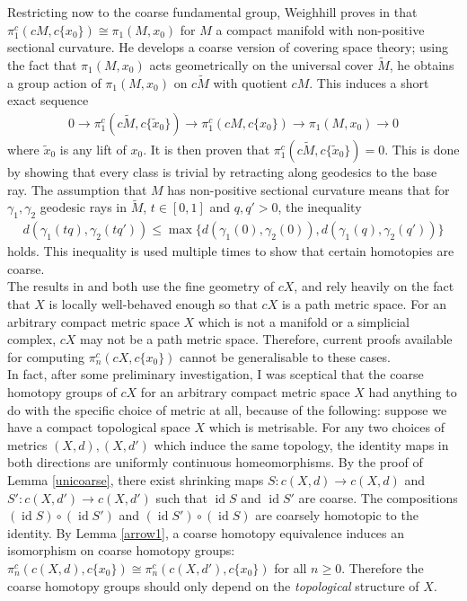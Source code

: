 \documentclass[a4paper,11pt]{article}
\theoremstyle{definition}
\theoremstyle{plain}
\theoremstyle{remark}
\DeclareMathOperator{\id}{id}
\begin{document}
Restricting now to the coarse fundamental group, Weighhill proves in \cite{weighill2025liftingcoarsehomotopies} that $\pi^{c}_{1}(cM,c\{x_0\}) \cong \pi_{1}(M,x_0)$ for $M$ a compact manifold with non-positive sectional curvature. He develops a coarse version of covering space theory; using the fact that $ \pi_{1}(M,x_0)$ acts geometrically on the universal cover $\tilde{M}$, he obtains a group action of $\pi_{1}(M,x_0)$ on $c\tilde{M}$ with quotient $cM$. This induces a short exact sequence
\begin{align*}
0\rightarrow \pi^{c}_{1}(c\tilde{M}, c \{\tilde{x}_{0}\}) \rightarrow  \pi_{1}^{c}(cM,c\{x_0\}) \rightarrow  \pi_{1}(M,x_0) \rightarrow 0
\end{align*}
where $\tilde{x}_{0}$ is any lift of $x_0$. It is then proven that $\pi^{c}_{1}(c\tilde{M}, c \{\tilde{x}_{0}\}) = 0$. This is done by showing that every class is trivial by retracting along geodesics to the base ray. The assumption that $M$ has non-positive sectional curvature means that for $\gamma_{1},\gamma_{2}$ geodesic rays in $\tilde{M}$, $t\in [0,1]$ and $q,q'>0$, the inequality 
\begin{align*}
d(\gamma_{1}(tq),\gamma_{2}(tq'))\leq \max \{d(\gamma_{1}(0),\gamma_{2}(0)),d(\gamma_{1}(q),\gamma_{2}(q')) \}
\end{align*}
holds. This inequality is used multiple times to show that certain homotopies are coarse.  \\


The results in \cite{mitchener2020coarse} and \cite{weighill2025liftingcoarsehomotopies} both use the fine geometry of $cX$, and rely heavily on the fact that $X$ is locally well-behaved enough so that $cX$ is a path metric space. For an arbitrary compact metric space $X$ which is not a manifold or a simplicial complex, $cX$ may not be a path metric space. Therefore, current proofs available for computing $\pi_{n}^{c}(cX,c\{x_0\})$ cannot be generalisable to these cases. \\ 

In fact, after some preliminary investigation, I was sceptical that the coarse homotopy groups of $cX$ for an arbitrary compact metric space $X$ had anything to do with the specific choice of metric at all, because of the following: suppose we have a compact topological space $X$ which is metrisable. For any two choices of metrics $(X,d),(X,d')$ which induce the same topology, the identity maps in both directions are uniformly continuous homeomorphisms. By the proof of Lemma \ref{unicoarse}, there exist shrinking maps $S: c(X,d)\rightarrow c(X,d)$ and $S': c(X,d')\rightarrow c(X,d')$ such that $\id S$ and $\id S'$ are coarse. The compositions $(\id S)\circ(\id S')$ and $(\id S')\circ(\id S)$ are coarsely homotopic to the identity. By Lemma \ref{arrow1}, a coarse homotopy equivalence induces an isomorphism on coarse homotopy groups: $\pi_{n}^{c}(c(X,d),c\{x_0\}) \cong \pi_{n}^{c}(c(X,d'),c\{x_0\}) $ for all $n\geq 0$. Therefore the coarse homotopy groups should only depend on the \textit{topological} structure of $X$. \\
\end{document}
